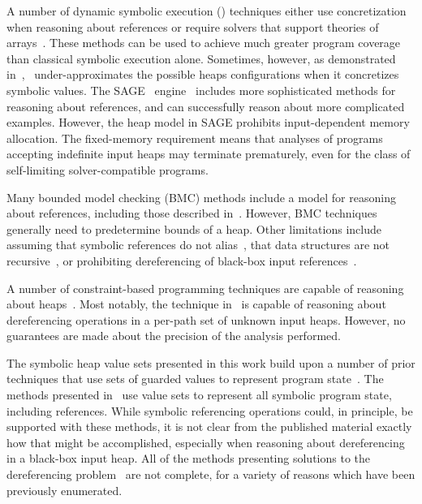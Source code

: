 A number of dynamic symbolic execution (\dsetxt{}) techniques either use
concretization when reasoning about references or require solvers that
support theories of
arrays~\cite{Godefroid:2005,Sen:2005,Godefroid:POPL07,Tillmann:2008}. 
These methods can be used to achieve much greater program
coverage than classical symbolic execution alone. Sometimes,
however, as demonstrated in~\cite{Elkarablieh:2009},~\dsetxt{}
under-approximates the possible heaps configurations when it
concretizes symbolic values. The SAGE~\dsetxt{}
engine~\cite{Elkarablieh:2009} includes more sophisticated methods for
reasoning about references, and can successfully reason about more
complicated examples. However, the heap model in SAGE prohibits
input-dependent memory allocation. The fixed-memory requirement means
that analyses of programs accepting indefinite input heaps may
terminate prematurely, even for the class of self-limiting
solver-compatible programs.

Many bounded model checking (BMC) methods include a model for
reasoning about references, including those described
in~\cite{Clarke:2004,Barnett:2006,Xie:2005,Babic:2007,Dillig:2011}. However,
BMC techniques generally need to predetermine bounds of a heap. Other
limitations include assuming that symbolic references do not
alias~\cite{Xie:2005,Babic:2007}, that data structures are not
recursive~\cite{Dillig:2011}, or prohibiting dereferencing of
black-box input references~\cite{Clarke:2004}.

A number of constraint-based programming techniques are capable of
reasoning about
heaps~\cite{Degrave:2010,Charreteur:2009,Albert:2013}. Most notably,
the technique in~\cite{Albert:2013} is capable of reasoning about
dereferencing operations in a per-path set of unknown input
heaps. However, no guarantees are made about the precision of the
analysis performed.

The symbolic heap value sets presented in this work build upon a
number of prior techniques that use sets of guarded values to
represent program
state~\cite{Sen:2014,Torlak:2014,Yorsh:2008,Xie:2005,Dillig:2011,Elkarablieh:2009}. The
methods presented in~\cite{Sen:2014,Torlak:2014,Yorsh:2008} use value
sets to represent all symbolic program state, including
references. While symbolic referencing operations could, in principle,
be supported with these methods, it is not clear from the published
material exactly how that might be accomplished, especially when
reasoning about dereferencing in a black-box input heap. All of the
methods presenting solutions to the dereferencing
problem~\cite{Xie:2005,Dillig:2011,Elkarablieh:2009} are not complete,
for a variety of reasons which have been previously enumerated.

